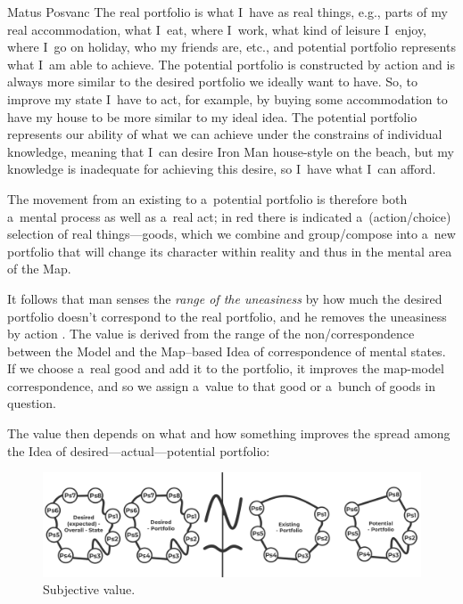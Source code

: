 \begin{artengenv}{Matus Posvanc}
The real portfolio is what I~have as real things, e.g., parts of my real accommodation, what I~eat, where I~work, what kind of leisure I~enjoy, where I~go on holiday, who my friends are, etc., and potential portfolio represents what I~am able to achieve. The potential portfolio is constructed by action and is always more similar to the desired portfolio we ideally want to have. So, to improve my state I~have to act, for example, by buying some accommodation to have my house to be more similar to my ideal idea. The potential portfolio represents our ability of what we can achieve under the constrains of individual knowledge, meaning that I~can desire Iron Man house-style on the beach, but my knowledge is inadequate for achieving this desire, so I~have what I~can afford.



The movement from an existing to a~potential portfolio is therefore both a~mental process as well as a~real act; in red there is indicated a~(action/choice) selection of real things---goods, which we combine and group/compose into a~new portfolio that will change its character within reality and thus in the mental area of the Map.



It follows that man senses the \textit{range of the uneasiness} by how much the desired portfolio doesn't correspond to the real portfolio, and he removes the uneasiness by action 
\parencite[compare to][sec.5.69 and 5.70]{Hayek1952Sensory}. %
 The value is derived from the range of the non/correspondence between the Model and the Map–based Idea of correspondence of mental states. If we choose a~real good and add it to the portfolio, it improves the map-model correspondence, and so we assign a~value to that good or a~bunch of goods in question.



The value then depends on what and how something improves the spread among the Idea of desired---actual---potential portfolio:


\begin{figure}
 \begin{center}
 \includegraphics[width=.99\textwidth]{ART_Posvanc/Illustration3_PU.pdf}%
 \end{center}%
 \caption{Subjective value.}\label{pos:fig3}
\end{figure}




\end{artengenv}
